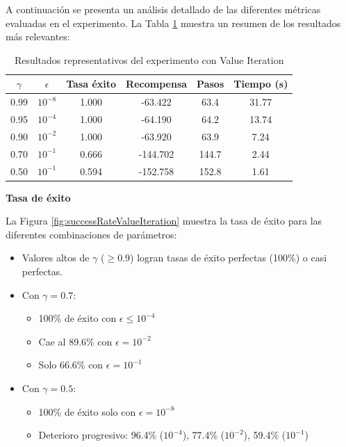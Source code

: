 A continuación se presenta un análisis detallado de las diferentes métricas evaluadas en el experimento. La Tabla \ref{tab:resultadosValueIteration} muestra un resumen de los resultados más relevantes:

\begin{table}[H]
    \centering
    \begin{tabular}{|c|c|c|c|c|c|}
        \hline
        $\gamma$ & $\epsilon$ & Tasa éxito & Recompensa & Pasos & Tiempo (s) \\
        \hline
        0.99 & $10^{-8}$ & 1.000 & -63.422 & 63.4 & 31.77 \\
        0.95 & $10^{-4}$ & 1.000 & -64.190 & 64.2 & 13.74 \\
        0.90 & $10^{-2}$ & 1.000 & -63.920 & 63.9 & 7.24 \\
        0.70 & $10^{-1}$ & 0.666 & -144.702 & 144.7 & 2.44 \\
        0.50 & $10^{-1}$ & 0.594 & -152.758 & 152.8 & 1.61 \\
        \hline
    \end{tabular}
    \caption{Resultados representativos del experimento con Value Iteration}
    \label{tab:resultadosValueIteration}
\end{table}

\textbf{Tasa de éxito}

La Figura \ref{fig:successRateValueIteration} muestra la tasa de éxito para las diferentes combinaciones de parámetros:

\begin{itemize}
    \item Valores altos de $\gamma$ ($\geq 0.9$) logran tasas de éxito perfectas (100\%) o casi perfectas.
    \item Con $\gamma = 0.7$:
    \begin{itemize}
        \item 100\% de éxito con $\epsilon \leq 10^{-4}$
        \item Cae al 89.6\% con $\epsilon = 10^{-2}$
        \item Solo 66.6\% con $\epsilon = 10^{-1}$
    \end{itemize}
    \item Con $\gamma = 0.5$:
    \begin{itemize}
        \item 100\% de éxito solo con $\epsilon = 10^{-8}$
        \item Deterioro progresivo: 96.4\% ($10^{-4}$), 77.4\% ($10^{-2}$), 59.4\% ($10^{-1}$)
    \end{itemize}
\end{itemize}

